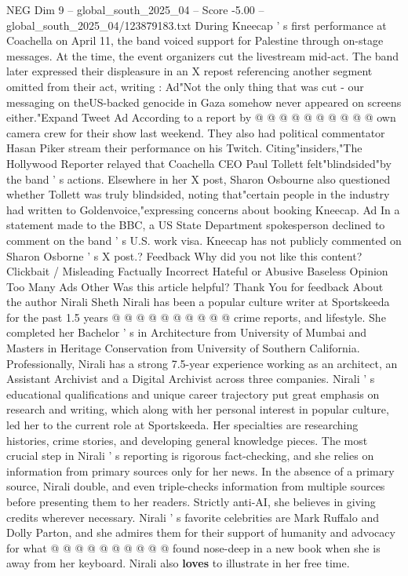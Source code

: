 \begin{textsample}{NEG Dim 9 – global\_south\_2025\_04 – Score -5.00 – global\_south\_2025\_04/123879183.txt}
During Kneecap ' s first performance at Coachella on April 11, the band voiced support for Palestine through on-stage messages.
At the time, the event organizers cut the livestream mid-act.
The band later expressed their displeasure in an X repost referencing another segment omitted from their act, writing : Ad"Not the only thing that was cut - our messaging on theUS-backed genocide in Gaza somehow never appeared on screens either."Expand Tweet Ad According to a report by @ @ @ @ @ @ @ @ @ @ own camera crew for their show last weekend.
They also had political commentator Hasan Piker stream their performance on his Twitch.
Citing"insiders,"The Hollywood Reporter relayed that Coachella CEO Paul Tollett felt"blindsided"by the band ' s actions.
Elsewhere in her X post, Sharon Osbourne also questioned whether Tollett was truly blindsided, noting that"certain people in the industry had written to Goldenvoice,"expressing concerns about booking Kneecap.
Ad In a statement made to the BBC, a US State Department spokesperson declined to comment on the band ' s U.S. work visa.
Kneecap has not publicly commented on Sharon Osborne ' s X post.?
Feedback Why did you not like this content?
Clickbait / Misleading Factually Incorrect Hateful or Abusive Baseless Opinion Too Many Ads Other Was this article helpful?
Thank You for feedback About the author Nirali Sheth Nirali has been a popular culture writer at Sportskeeda for the past 1.5 years @ @ @ @ @ @ @ @ @ @ crime reports, and lifestyle.
She completed her Bachelor ' s in Architecture from University of Mumbai and Masters in Heritage Conservation from University of Southern California.
Professionally, Nirali has a strong 7.5-year experience working as an architect, an Assistant Archivist and a Digital Archivist across three companies.
Nirali ' s educational qualifications and unique career trajectory put great emphasis on research and writing, which along with her personal interest in popular culture, led her to the current role at Sportskeeda.
Her specialties are researching histories, crime stories, and developing general knowledge pieces.
The most crucial step in Nirali ' s reporting is rigorous fact-checking, and she relies on information from primary sources only for her news.
In the absence of a primary source, Nirali double, and even triple-checks information from multiple sources before presenting them to her readers.
Strictly anti-AI, she believes in giving credits wherever necessary.
Nirali ' s favorite celebrities are Mark Ruffalo and Dolly Parton, and she admires them for their support of humanity and advocacy for what @ @ @ @ @ @ @ @ @ @ found nose-deep in a new book when she is away from her keyboard.
Nirali also \textbf{loves} to illustrate in her free time.

\end{textsample}
